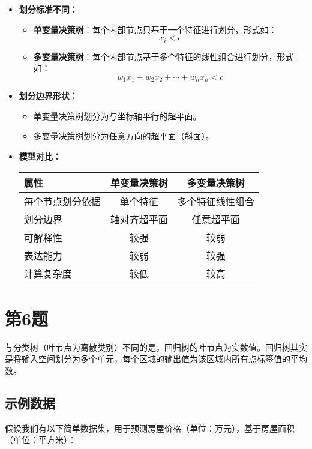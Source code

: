 \documentclass{article}
\begin{document}
\begin{itemize}
  \item \textbf{划分标准不同：}
    \begin{itemize}
      \item \textbf{单变量决策树}：每个内部节点只基于一个特征进行划分，形式如：
      \[
      x_i < c
      \]
      \item \textbf{多变量决策树}：每个内部节点基于多个特征的线性组合进行划分，形式如：
      \[
      w_1 x_1 + w_2 x_2 + \cdots + w_n x_n < c
      \]
    \end{itemize}
    
  \item \textbf{划分边界形状：}
    \begin{itemize}
      \item 单变量决策树划分为与坐标轴平行的超平面。
      \item 多变量决策树划分为任意方向的超平面（斜面）。
    \end{itemize}

  \item \textbf{模型对比：}

  \begin{center}
  \begin{tabular}{|l|c|c|}
  \hline
  \textbf{属性} & \textbf{单变量决策树} & \textbf{多变量决策树} \\
  \hline
  每个节点划分依据 & 单个特征 & 多个特征线性组合 \\
  \hline
  划分边界 & 轴对齐超平面 & 任意超平面 \\
  \hline
  可解释性 & 较强 & 较弱 \\
  \hline
  表达能力 & 较弱 & 较强 \\
  \hline
  计算复杂度 & 较低 & 较高 \\
  \hline
  \end{tabular}
  \end{center}
\end{itemize}

\section*{第6题}
与分类树（叶节点为离散类别）不同的是，回归树的叶节点为实数值。回归树其实是将输入空间划分为多个单元，每个区域的输出值为该区域内所有点标签值的平均数。
\subsection{示例数据}
假设我们有以下简单数据集，用于预测房屋价格（单位：万元），基于房屋面积（单位：平方米）：
\end{document}
